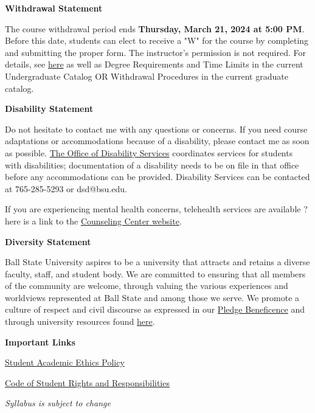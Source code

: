 \documentclass{article}
\begin{document}
\newpage

\textbf{\large Withdrawal Statement}\medskip

The course withdrawal period ends \textbf{Thursday, March 21, 2024 at 5:00 PM}. Before this date, students can elect to receive a "W" for the course by completing and submitting the proper form. The instructor's permission is not required. For details, see \href{https://www.bsu.edu/about/administrativeoffices/registrar/registration-activities/withdraw-from-classes}{here} as well as Degree Requirements and Time Limits in the current Undergraduate Catalog OR Withdrawal Procedures in the current graduate catalog.\bigskip

\textbf{\large Disability Statement}\medskip

Do not hesitate to contact me with any questions or concerns. If you need course adaptations or accommodations because of a disability, please contact me as soon as possible. \href{https://www.bsu.edu/about/administrativeoffices/disability-services}{The Office of Disability Services} coordinates services for students with disabilities; documentation of a disability needs to be on file in that office before any accommodations can be provided. Disability Services can be contacted at 765-285-5293 or dsd@bsu.edu.

If you are experiencing mental health concerns, telehealth services are available ? here is a link to the \href{https://www.bsu.edu/campuslife/counseling-center}{Counseling Center website}.\bigskip

\textbf{\large Diversity Statement}\medskip

Ball State University aspires to be a university that attracts and retains a diverse faculty, staff, and student body. We are committed to ensuring that all members of the community are welcome, through valuing the various experiences and worldviews represented at Ball State and among those we serve. We promote a culture of respect and civil discourse as expressed in our \href{https://www.bsu.edu/about/beneficence}{Pledge Beneficence} and through university resources found \href{http://bsu.edu/campuslife/multiculturalcenter}{here}.\bigskip

\textbf{\large Important Links}\medskip

\href{https://www.bsu.edu/about/administrativeoffices/vice-provost/student-services/academic-integrity}{Student Academic Ethics Policy}

\href{https://www.bsu.edu/about/administrativeoffices/student-conduct/policiesandprocedures}{Code of Student Rights and Responsibilities}\bigskip

\center \textit{Syllabus is subject to change}
\end{document}
